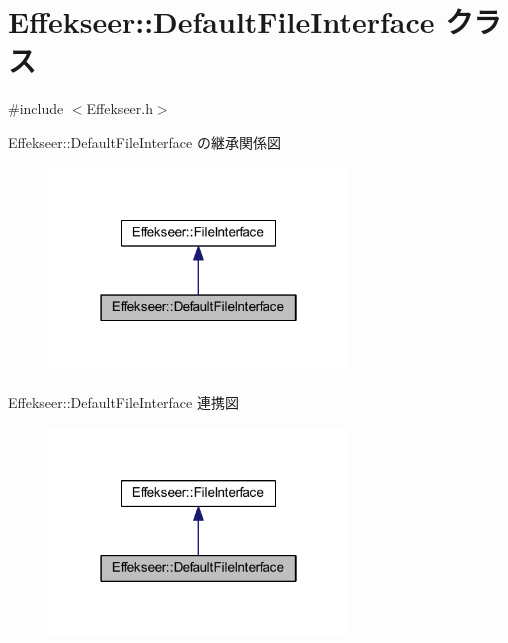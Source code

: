 \hypertarget{class_effekseer_1_1_default_file_interface}{}\section{Effekseer\+:\+:Default\+File\+Interface クラス}
\label{class_effekseer_1_1_default_file_interface}


{\ttfamily \#include $<$Effekseer.\+h$>$}



Effekseer\+:\+:Default\+File\+Interface の継承関係図\nopagebreak
\begin{figure}[H]
\begin{center}
\leavevmode
\includegraphics[width=226pt]{class_effekseer_1_1_default_file_interface__inherit__graph}
\end{center}
\end{figure}


Effekseer\+:\+:Default\+File\+Interface 連携図\nopagebreak
\begin{figure}[H]
\begin{center}
\leavevmode
\includegraphics[width=226pt]{class_effekseer_1_1_default_file_interface__coll__graph}
\end{center}
\end{figure}

